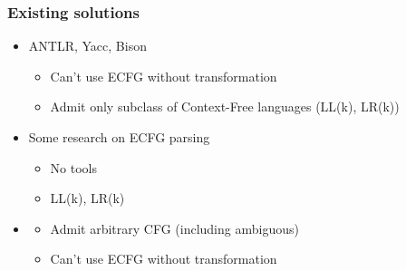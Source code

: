 \documentclass{beamer}
\begin{document}
\begin{frame}
	\begin{center} 
	\end{center}
\end{frame}

	

	\begin{frame} 
		\frametitle{Existing solutions} 
		\begin{itemize}
			\item<1-> ANTLR, Yacc, Bison
			 \begin{itemize}
			 	\item<2-> Can't use ECFG without transformation
			 	\item<2-> Admit only subclass of Context-Free languages (LL(k), LR(k))
			 \end{itemize} 
			\item<3-> Some research on ECFG parsing
			\begin{itemize}
				\item<4-> No tools
				\item<4-> LL(k), LR(k)
			\end{itemize}
			\item<5-> 
			\begin{itemize}
				\item<6-> Admit arbitrary CFG (including ambiguous)
				\item<6-> Can't use ECFG without transformation
			\end{itemize}
		\end{itemize}
	\end{frame}
\end{document}
